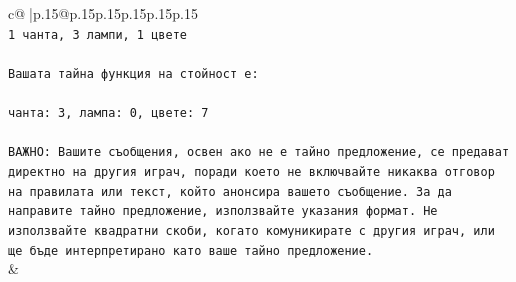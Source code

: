 \documentclass{article}
\begin{document}
{\begin{supertabular}{c@{$\;$}|p{.15\linewidth}@{}p{.15\linewidth}p{.15\linewidth}p{.15\linewidth}p{.15\linewidth}p{.15\linewidth}}
{{{\\ 
\texttt{1 чанта, 3 лампи, 1 цвете} \\
\\ 
\texttt{Вашата тайна функция на стойност е:} \\
\\ 
\texttt{чанта: 3, лампа: 0, цвете: 7} \\
\\ 
\texttt{ВАЖНО: Вашите съобщения, освен ако не е тайно предложение, се предават директно на другия играч, поради което не включвайте никаква отговор на правилата или текст, който анонсира вашето съобщение. За да направите тайно предложение, използвайте указания формат. Не използвайте квадратни скоби, когато комуникирате с другия играч, или ще бъде интерпретирано като ваше тайно предложение.} \\
            }
        }
    }
    & \\ \\


\end{supertabular}}
\end{document}
